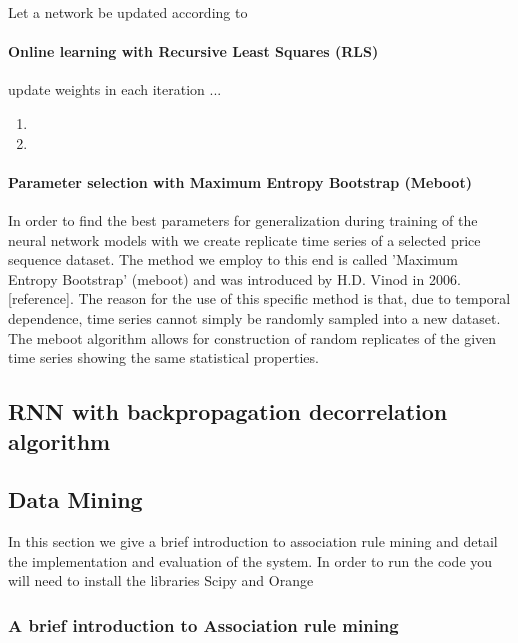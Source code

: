 \begin{frm-thm}
Let a network be updated according to
\end{frm-thm}

\paragraph*{Online learning with Recursive Least Squares (RLS)}
update weights in each iteration
...
\begin{frm-algo}
\begin{enumerate}
	\item

	\item

\end{enumerate}
\end{frm-algo}

\paragraph*{Parameter selection with Maximum Entropy Bootstrap (Meboot)}
In order to find the best parameters for generalization during training of the neural network models with we create replicate time series of a selected price sequence dataset. The method we employ to this end is called 'Maximum Entropy Bootstrap' (meboot) and was introduced by H.D. Vinod in 2006. [reference]. The reason for the use of this specific method is that, due to temporal dependence, time series cannot simply be randomly sampled into a new dataset. The meboot algorithm allows for construction of random replicates of the given time series showing the same statistical properties.

\subsection*{RNN with backpropagation decorrelation algorithm}

\subsection*{Data Mining}

In this section we give a brief introduction to association rule mining and detail the implementation and evaluation of the system. In order to run the code you will need to install the libraries Scipy and Orange 

\subsubsection{A brief introduction to Association rule mining}

